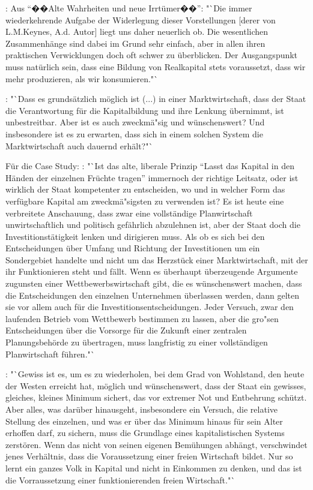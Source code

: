 \documentclass[
    onecolumn,
    a4paper,
    abstracton,
    parskip=half
    ,final
    ]{scrartcl}
\begin{document}
\citep[vgl.][S.19]{Hayek1969}: Aus "`��Alte Wahrheiten und neue Irrt{\"u}mer��"': "`Die immer wiederkehrende Aufgabe der Widerlegung dieser Vorstellungen [derer von L.M.Keynes, A.d. Autor] liegt uns daher neuerlich ob. Die wesentlichen Zusammenh{\"a}nge sind dabei im Grund sehr einfach, aber in allen ihren praktischen Verwicklungen doch oft schwer zu {\"u}berblicken.
Der Ausgangspunkt muss nat{\"u}rlich sein, dass eine Bildung von Realkapital stets voraussetzt, dass wir mehr produzieren, als wir konsumieren."`

\citep[vgl.][S.22]{Hayek1969}: "`Dass es grunds{\"a}tzlich m{\"o}glich ist (...) in einer Marktwirtschaft, dass der Staat die Verantwortung f{\"u}r die Kapitalbildung und ihre Lenkung {\"u}bernimmt, ist unbestreitbar. Aber ist es auch zweckm{\"a}{"s}ig und w{\"u}nschenswert? Und insbesondere ist es zu erwarten, dass sich in einem solchen System die Marktwirtschaft auch dauernd erh{\"a}lt?"`

F{\"u}r die Case Study:
\citep[vgl.][S.23f]{Hayek1969}: "`Ist das alte, liberale Prinzip “Lasst das Kapital in den H{\"a}nden der einzelnen Fr{\"u}chte tragen” immernoch der richtige Leitsatz, oder ist wirklich der Staat kompetenter zu entscheiden, wo und in welcher Form das verf{\"u}gbare Kapital am zweckm{\"a}{"s}igsten zu verwenden ist?
Es ist heute eine verbreitete Anschauung, dass zwar eine vollst{\"a}ndige Planwirtschaft unwirtschaftlich und politisch gef{\"a}hrlich abzulehnen ist, aber der Staat doch die Investitionst{\"a}tigkeit lenken und dirigieren muss. Als ob es sich bei den Entscheidungen {\"u}ber Umfang und Richtung der Investitionen um ein Sondergebiet handelte und nicht um das Herzst{\"u}ck einer Marktwirtschaft, mit der ihr Funktionieren steht und f{\"a}llt. Wenn es {\"u}berhaupt {\"u}berzeugende Argumente zugunsten einer Wettbewerbswirtschaft gibt, die es w{\"u}nschenswert machen, dass die Entscheidungen den einzelnen Unternehmen {\"u}berlassen werden, dann gelten sie vor allem auch f{\"u}r die Investitionsentscheidungen. Jeder Versuch, zwar den laufenden Betrieb vom Wettbewerb bestimmen zu lassen, aber die gro{"s}en Entscheidungen {\"u}ber die Vorsorge f{\"u}r die Zukunft einer zentralen Planungsbeh{\"o}rde zu {\"u}bertragen, muss langfristig zu einer vollst{\"a}ndigen Planwirtschaft f{\"u}hren."`

\citep[vgl.][S.31]{Hayek1969}: "`Gewiss ist es, um es zu wiederholen, bei dem Grad von Wohlstand, den heute der Westen erreicht hat, m{\"o}glich und w{\"u}nschenswert, dass der Staat ein gewisses, gleiches, kleines Minimum sichert, das vor extremer Not und Entbehrung sch{\"u}tzt. Aber alles, was dar{\"u}ber hinausgeht, insbesondere ein Versuch, die relative Stellung des einzelnen, und was er {\"u}ber das Minimum hinaus f{\"u}r sein Alter erhoffen darf, zu sichern, muss die Grundlage eines kapitalistischen Systems zerst{\"o}ren. Wenn das nicht von seinen eigenen Bem{\"u}hungen abh{\"a}ngt, verschwindet jenes Verh{\"a}ltnis, dass die Voraussetzung einer freien Wirtschaft bildet. Nur so lernt ein ganzes Volk in Kapital und nicht in Einkommen zu denken, und das ist die Vorraussetzung einer funktionierenden freien Wirtschaft."`
\end{document}
